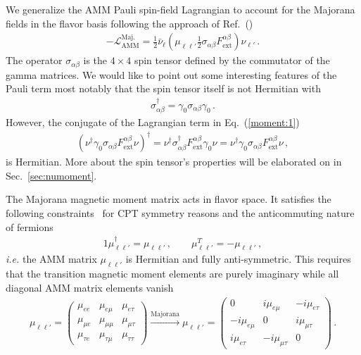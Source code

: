 \documentclass[addchapnum]{ws-rv961x669} %
\newcommand{\req}[1]{Eq.~(\ref{#1})}
\newcommand{\rsec}[1]{Sec.~{\ref{#1}}}
\begin{document}
We generalize the AMM Pauli spin-field Lagrangian to account for the Majorana fields in the flavor basis following the approach of Ref.~(\citeauthor{Veltman:1997am})
\begin{align}
\label{moment:1}
-\mathcal{L}_{\mathrm{AMM}}^\mathrm{Maj.}=\frac{1}{2}\bar\nu_{\ell}\left(\mu_{\ell\ell'}\frac{1}{2}\sigma_{\alpha\beta}F^{\alpha\beta}_\mathrm{ext}\right)\nu_{\ell'}\,.
\end{align}
The operator $\sigma_{\alpha\beta}$ is the $4\times 4$ spin tensor defined by the commutator of the gamma matrices. We would like to point out some interesting features of the Pauli term most notably that the spin tensor itself is not Hermitian with
\begin{align}
\label{notherm:1}
\sigma_{\alpha\beta}^{\dag} = \gamma_{0}\sigma_{\alpha\beta}\gamma_{0}\,.
\end{align}
However, the conjugate of the Lagrangian term in \req{moment:1}
\begin{align}
\left(\nu^{\dag}\gamma_{0}\sigma_{\alpha\beta}F^{\alpha\beta}_\mathrm{ext}\nu\right)^{\dag} = \nu^{\dag}\sigma_{\alpha\beta}^{\dag}F^{\alpha\beta}_\mathrm{ext}\gamma_{0}\nu = \nu^{\dag}\gamma_{0}\sigma_{\alpha\beta}F^{\alpha\beta}_\mathrm{ext}\nu\,,
\end{align}
is Hermitian. More about the spin tensor's properties will be elaborated on in \rsec{sec:numoment}.

The Majorana magnetic moment matrix acts in flavor space. It satisfies the following constraints~\cite{Giunti:2014ixa} for CPT symmetry reasons and the anticommuting nature of fermions
\begin{alignat}{1}
\label{props:1}
\mu_{\ell\ell'}^{\dag}=\mu_{\ell\ell'}\,,\qquad
\mu_{\ell\ell'}^{T}=-\mu_{\ell\ell'}\,,
\end{alignat}
{\it i.e.\/} the AMM matrix $\mu_{\ell\ell'}$ is Hermitian and fully anti-symmetric. This requires that the transition magnetic moment elements are purely imaginary while all diagonal AMM matrix elements vanish
\begin{align}
\label{mu:1}
\mu_{\ell\ell'}=
\begin{pmatrix}
\mu_{ee} & \mu_{e\mu} & \mu_{e\tau} \\
\mu_{\mu e} & \mu_{\mu\mu} & \mu_{\mu\tau} \\
\mu_{\tau e} & \mu_{\tau\mu} & \mu_{\tau\tau}
\end{pmatrix}\xrightarrow{\mathrm{Majorana}}
\mu_{\ell\ell'}=
\begin{pmatrix}
0 & i\mu_{e\mu} & -i\mu_{e\tau} \\
-i\mu_{e\mu} & 0 & i\mu_{\mu\tau} \\
i\mu_{e\tau} & -i\mu_{\mu\tau} & 0
\end{pmatrix}\,.
\end{align}
\end{document}
